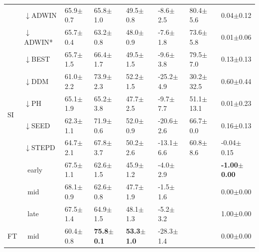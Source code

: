 \begin{tabular}{llllllll}
\midrule
\multirow[t]{10}{*}{SI} & $\downarrow$ADWIN & 65.9\tiny{$\pm$0.7} & 65.8\tiny{$\pm$1.0} & 49.5\tiny{$\pm$0.8} & -8.6\tiny{$\pm$2.5} & 80.4\tiny{$\pm$5.6} & 0.04\tiny{$\pm$0.12} \\
 & $\downarrow$ADWIN* & 65.7\tiny{$\pm$0.4} & 63.2\tiny{$\pm$0.8} & 48.0\tiny{$\pm$0.9} & -7.6\tiny{$\pm$1.8} & 73.6\tiny{$\pm$5.8} & 0.01\tiny{$\pm$0.06} \\
 & $\downarrow$BEST & 65.7\tiny{$\pm$1.5} & 66.4\tiny{$\pm$1.7} & 49.5\tiny{$\pm$1.5} & -9.6\tiny{$\pm$3.8} & 79.5\tiny{$\pm$7.0} & 0.13\tiny{$\pm$0.13} \\
 & $\downarrow$DDM & 61.0\tiny{$\pm$2.2} & 73.9\tiny{$\pm$2.3} & 52.2\tiny{$\pm$1.5} & -25.2\tiny{$\pm$4.9} & 30.2\tiny{$\pm$32.5} & 0.60\tiny{$\pm$0.44} \\
 & $\downarrow$PH & 65.1\tiny{$\pm$1.9} & 65.2\tiny{$\pm$3.8} & 47.7\tiny{$\pm$2.5} & -9.7\tiny{$\pm$7.7} & 51.1\tiny{$\pm$13.1} & 0.01\tiny{$\pm$0.23} \\
 & $\downarrow$SEED & 62.3\tiny{$\pm$1.1} & 71.9\tiny{$\pm$0.6} & 52.0\tiny{$\pm$0.9} & -20.6\tiny{$\pm$2.6} & 66.7\tiny{$\pm$0.0} & 0.16\tiny{$\pm$0.13} \\
 & $\downarrow$STEPD & 64.7\tiny{$\pm$2.1} & 67.8\tiny{$\pm$3.7} & 50.2\tiny{$\pm$2.6} & -13.1\tiny{$\pm$6.6} & 60.8\tiny{$\pm$8.6} & -0.04\tiny{$\pm$0.15} \\
 & $\ \;$early & 67.5\tiny{$\pm$1.1} & 62.6\tiny{$\pm$1.5} & 45.9\tiny{$\pm$1.2} & -4.0\tiny{$\pm$2.9} &  & \textbf{-1.00\tiny{$\pm$0.00}} \\
 & $\ \;$mid & 68.1\tiny{$\pm$0.9} & 62.6\tiny{$\pm$0.8} & 47.7\tiny{$\pm$1.9} & -1.5\tiny{$\pm$1.6} &  & 0.00\tiny{$\pm$0.00} \\
 & $\ \;$late & 67.5\tiny{$\pm$1.4} & 64.9\tiny{$\pm$1.5} & 48.1\tiny{$\pm$1.3} & -5.2\tiny{$\pm$3.2} &  & 1.00\tiny{$\pm$0.00} \\
\midrule
FT & $\ \;$mid & 60.4\tiny{$\pm$0.8} & \textbf{75.8\tiny{$\pm$0.1}} & \textbf{53.3\tiny{$\pm$1.0}} & -28.3\tiny{$\pm$1.4} &  & 0.00\tiny{$\pm$0.00} \\
\bottomrule
\end{tabular}
